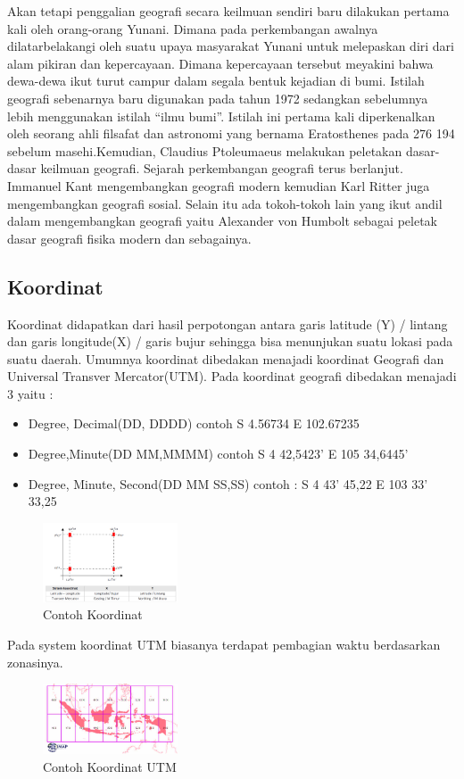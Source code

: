 Akan tetapi penggalian geografi secara keilmuan sendiri baru dilakukan pertama kali oleh orang-orang Yunani. Dimana pada perkembangan awalnya dilatarbelakangi oleh suatu upaya masyarakat Yunani untuk melepaskan diri dari alam pikiran dan kepercayaan. Dimana kepercayaan tersebut meyakini bahwa dewa-dewa ikut turut campur dalam segala bentuk kejadian di bumi.\hfill\break
Istilah geografi sebenarnya baru digunakan pada tahun 1972 sedangkan sebelumnya lebih menggunakan istilah “ilmu bumi”. Istilah ini pertama kali diperkenalkan oleh seorang ahli filsafat dan astronomi yang bernama Eratosthenes pada 276 194 sebelum masehi.Kemudian, Claudius Ptoleumaeus melakukan peletakan dasar-dasar keilmuan geografi.\hfill\break
Sejarah perkembangan geografi terus berlanjut. Immanuel Kant mengembangkan geografi modern kemudian Karl Ritter juga mengembangkan geografi sosial.\hfill\break
Selain itu ada tokoh-tokoh lain yang ikut andil dalam mengembangkan geografi yaitu Alexander von Humbolt sebagai peletak dasar geografi fisika modern dan sebagainya.\hfill\break
\subsection{Koordinat}
Koordinat didapatkan dari hasil perpotongan antara garis latitude (Y) / lintang dan garis longitude(X) / garis bujur sehingga bisa menunjukan suatu lokasi pada suatu daerah. \hfill\break 
Umumnya koordinat dibedakan menajadi koordinat Geografi dan Universal Transver Mercator(UTM). Pada koordinat geografi dibedakan menajadi 3 yaitu : \hfill\break
\begin{itemize}
	\item Degree, Decimal(DD, DDDD) contoh S 4.56734 E 102.67235
	\item Degree,Minute(DD MM,MMMM) contoh S 4 42,5423’ E 105 34,6445’
	\item Degree, Minute, Second(DD MM SS,SS) contoh : S 4 43’ 45,22 E 103 33’ 33,25
\end{itemize}
\hfill\break
\begin{figure}[H]
	\includegraphics[width=4cm]{figures/1174027/1_1174027_koordinat.jpg}
	\centering
	\caption{Contoh Koordinat}
\end{figure}
Pada system koordinat UTM biasanya terdapat pembagian waktu berdasarkan zonasinya. \hfill\break
\begin{figure}[H]
	\includegraphics[width=4cm]{figures/1174027/1_1174027_UTM.jpg}
	\centering
	\caption{Contoh Koordinat UTM}
\end{figure}

